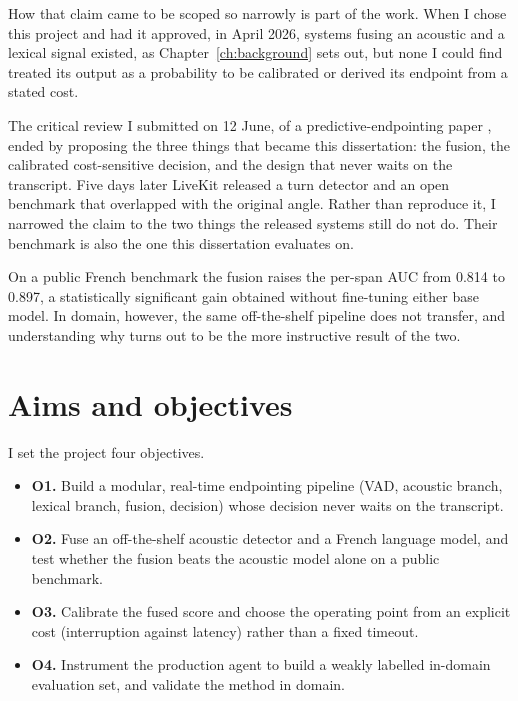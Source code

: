 How that claim came to be scoped so narrowly is part of the work. When I chose this project
and had it approved, in April 2026, systems fusing an acoustic and a lexical signal existed,
as Chapter~\ref{ch:background} sets out, but none I could find treated its output as a
probability to be calibrated or derived its endpoint from a stated cost. 

The critical review I submitted on 12 June, of a predictive-endpointing paper \citep{zink2024predictive}, ended
by proposing the three things that became this dissertation: the fusion, the calibrated
cost-sensitive decision, and the design that never waits on the transcript. Five days later
LiveKit released a turn detector and an open benchmark that overlapped with the original
angle. Rather than reproduce it, I narrowed the claim to the two things the released systems
still do not do. Their benchmark is also the one this dissertation evaluates on.

On a public French benchmark the fusion raises the per-span AUC from 0.814 to
0.897, a statistically significant gain obtained without fine-tuning either base model.
In domain, however, the same off-the-shelf pipeline does not transfer, and understanding
why turns out to be the more instructive result of the two.

\section{Aims and objectives}
\label{sec:objectives}

I set the project four objectives.

\begin{itemize}
\item \textbf{O1.} Build a modular, real-time endpointing pipeline (VAD, acoustic branch,
lexical branch, fusion, decision) whose decision never waits on the transcript.

\item \textbf{O2.} Fuse an off-the-shelf acoustic detector and a French language model, and
test whether the fusion beats the acoustic model alone on a public benchmark.

\item \textbf{O3.} Calibrate the fused score and choose the operating point from an
explicit cost (interruption against latency) rather than a fixed timeout.

\item \textbf{O4.} Instrument the production agent to build a weakly labelled in-domain
evaluation set, and validate the method in domain.

\end{itemize}
